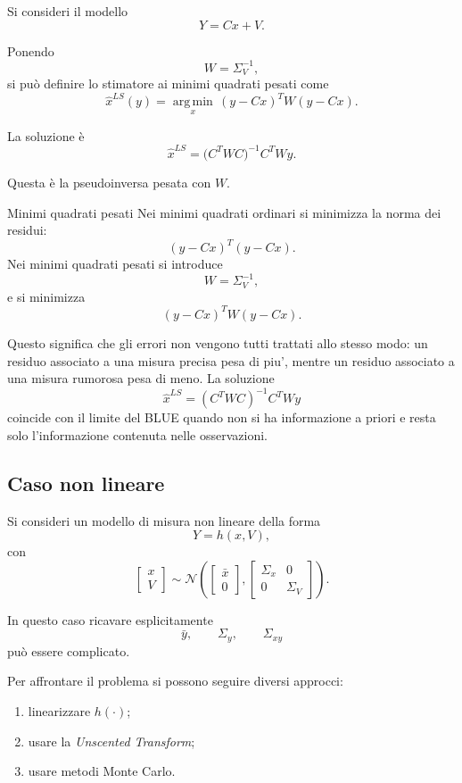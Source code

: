 \documentclass[11pt,a4paper]{article}
\begin{document}
Si consideri il modello
\[
Y=Cx+V.
\]

Ponendo
\[
W=\Sigma_V^{-1},
\]
si può definire lo stimatore ai minimi quadrati pesati come
\[
\hat x^{LS}(y)
=
\operatorname*{arg\,min}_{x}
\,(y-Cx)^T W (y-Cx).
\]

La soluzione è
\[
\hat x^{LS}
=
\bigl(C^TWC\bigr)^{-1}C^TWy.
\]

Questa è la pseudoinversa pesata con \(W\).

\begin{spiegazione}{Minimi quadrati pesati}
Nei minimi quadrati ordinari si minimizza la norma dei residui:
\[
(y-Cx)^T(y-Cx).
\]
Nei minimi quadrati pesati si introduce
\[
W=\Sigma_V^{-1},
\]
e si minimizza
\[
(y-Cx)^TW(y-Cx).
\]

Questo significa che gli errori non vengono tutti trattati allo stesso modo: un residuo associato a una misura precisa pesa di piu', mentre un residuo associato a una misura rumorosa pesa di meno. La soluzione
\[
\hat x^{LS}=(C^TWC)^{-1}C^TWy
\]
coincide con il limite del BLUE quando non si ha informazione a priori e resta solo l'informazione contenuta nelle osservazioni.
\end{spiegazione}

\subsection*{Caso non lineare}

Si consideri un modello di misura non lineare della forma
\[
Y=h(x,V),
\]
con
\[
\begin{bmatrix}
x\\
V
\end{bmatrix}
\sim
\mathcal{N}\!\left(
\begin{bmatrix}
\bar x\\
0
\end{bmatrix},
\begin{bmatrix}
\Sigma_x & 0\\
0 & \Sigma_V
\end{bmatrix}
\right).
\]

In questo caso ricavare esplicitamente
\[
\bar y,\qquad \Sigma_y,\qquad \Sigma_{xy}
\]
può essere complicato.

Per affrontare il problema si possono seguire diversi approcci:

\begin{enumerate}
    \item linearizzare \(h(\cdot)\);
    \item usare la \emph{Unscented Transform};
    \item usare metodi Monte Carlo.
\end{enumerate}
\end{document}

